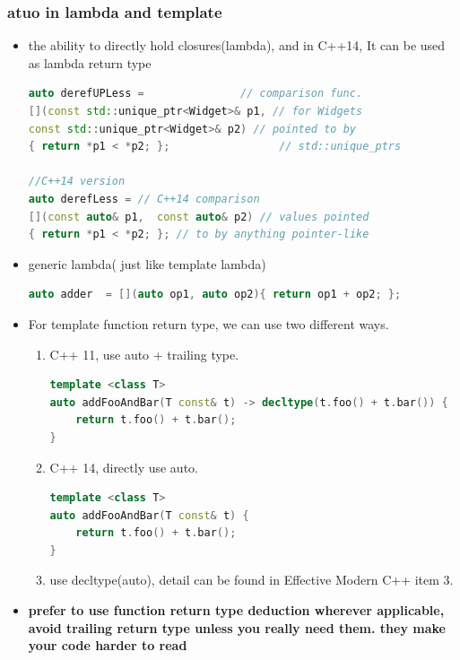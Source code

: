 \documentclass[a4paper,11pt,twoside]{book}
\begin{document}
\subsubsection{atuo in lambda and template}
\begin{itemize}
	\item the ability to directly hold closures(lambda), and in C++14, It can be used as lambda return type
\begin{lstlisting}[frame=single, language=c++]
auto derefUPLess =               // comparison func.
[](const std::unique_ptr<Widget>& p1, // for Widgets
const std::unique_ptr<Widget>& p2) // pointed to by
{ return *p1 < *p2; };                 // std::unique_ptrs
	
//C++14 version
auto derefLess = // C++14 comparison
[](const auto& p1,  const auto& p2) // values pointed
{ return *p1 < *p2; }; // to by anything pointer-like
	\end{lstlisting}
	
		\item generic lambda( just like template lambda)
\begin{lstlisting}[frame=single, language=c++]
auto adder  = [](auto op1, auto op2){ return op1 + op2; };
\end{lstlisting}
	
\item For template function return type, we can use two different ways.
\begin{enumerate}
	\item C++ 11, use auto + trailing type.
\begin{lstlisting}[frame=single, language=c++]
template <class T>
auto addFooAndBar(T const& t) -> decltype(t.foo() + t.bar()) {
	return t.foo() + t.bar();
}
\end{lstlisting}
	\item C++ 14, directly use auto.
\begin{lstlisting}[frame=single, language=c++]
template <class T>
auto addFooAndBar(T const& t) {
	return t.foo() + t.bar();
}
\end{lstlisting}
	\item use decltype(auto), detail can be found in Effective Modern C++ item 3.
\end{enumerate}
	
	\item \textbf{prefer to use function return type deduction wherever applicable, avoid trailing return type unless you really need them. they make your code harder to read}
	
\end{itemize}
\end{document}

